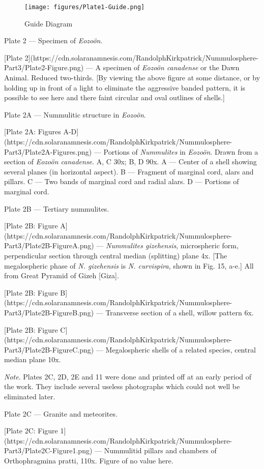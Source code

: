 \documentclass[a4paper, 12pt, oneside]{article}
\begin{document}
\clearpage
\begin{figure}[b]
\texttt{[image: figures/Plate1-Guide.png]}
\caption{Guide Diagram}
\centering
\end{figure}
\clearpage
Plate 2 --- Specimen of \emph{Eozoön}.

[Plate 2](https://cdn.solaranamnesis.com/RandolphKirkpatrick/Nummulosphere-Part3/Plate2-Figure.png) --- A specimen of \emph{Eozoön canadense} or the Dawn Animal. Reduced two-thirds. [By viewing the above figure at some distance, or by holding up in front of a light to eliminate the aggressive banded pattern, it is possible to see here and there faint circular and oval outlines of shells.]

Plate 2A --- Nummulitic structure in \emph{Eozoön}.

[Plate 2A: Figures A-D](https://cdn.solaranamnesis.com/RandolphKirkpatrick/Nummulosphere-Part3/Plate2A-Figures.png) --- Portions of \emph{Nummulites} in \emph{Eozoön}. Drawn from a section of \emph{Eozoön canadense}. A, C 30x; B, D 90x. A --- Center of a shell showing several planes (in horizontal aspect). B --- Fragment of marginal cord, alars and pillars. C --- Two bands of marginal cord and radial alars. D --- Portions of marginal cord.

Plate 2B --- Tertiary nummulites.

[Plate 2B: Figure A](https://cdn.solaranamnesis.com/RandolphKirkpatrick/Nummulosphere-Part3/Plate2B-FigureA.png) --- \emph{Nummulites gizehensis}, microspheric form, perpendicular section through central median (splitting) plane 4x. [The megalospheric phase of \emph{N. gizehensis} is \emph{N. curvispira}, shown in Fig. 15, a-e.] All from Great Pyramid of Gizeh [Giza].

[Plate 2B: Figure B](https://cdn.solaranamnesis.com/RandolphKirkpatrick/Nummulosphere-Part3/Plate2B-FigureB.png) --- Transverse section of a shell, willow pattern 6x.

[Plate 2B: Figure C](https://cdn.solaranamnesis.com/RandolphKirkpatrick/Nummulosphere-Part3/Plate2B-FigureC.png) --- Megalospheric shells of a related species, central median plane 10x.

\emph{Note}. Plates 2C, 2D, 2E and 11 were done and printed off at an early period of the work. They include several useless photographs which could not well be eliminated later.

Plate 2C --- Granite and meteorites.

[Plate 2C: Figure 1](https://cdn.solaranamnesis.com/RandolphKirkpatrick/Nummulosphere-Part3/Plate2C-Figure1.png) --- Nummulitid pillars and chambers of Orthophragmina pratti, 110x. Figure of no value here.
\end{document}
